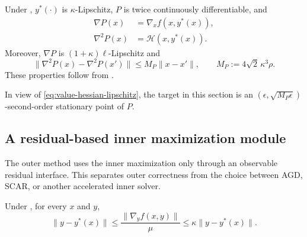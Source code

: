 \documentclass{article}
\begin{document}
\begin{lemma}\label{lem:value-geometry}
Under , $y^*(\cdot)$ is $\kappa$-Lipschitz, $P$ is twice
continuously differentiable, and
\begin{subequations}\label{eq:value-derivatives}
\begin{align}
 \nabla P(x)&=\nabla_xf(x,y^*(x)),\label{eq:value-gradient}\\
 \nabla^2P(x)&=\mathcal H(x,y^*(x)).\label{eq:value-hessian}
\end{align}
\end{subequations}
Moreover, $\nabla P$ is $(1+\kappa)\ell$-Lipschitz and
\begin{equation}\label{eq:value-hessian-lipschitz}
 \|\nabla^2P(x)-\nabla^2P(x')\|
 \le M_P\|x-x'\|,
 \qquad
 M_P:=4\sqrt2\,\kappa^3\rho.
\end{equation}
These properties follow from
\citet[Lemmas~1--3]{luo2022finding}.
\end{lemma}

In view of \eqref{eq:value-hessian-lipschitz}, the target in this
section is an
$(\epsilon,\sqrt{M_P\epsilon})$-second-order stationary point of $P$.

\subsection{A residual-based inner maximization module}

The outer method uses the inner maximization only through an observable
residual interface.  This separates outer correctness from the choice
between AGD, SCAR, or another accelerated inner solver.

\begin{lemma}
\label{lem:inner-residual-certificate}
Under , for every $x$ and $y$,
\begin{equation}\label{eq:inner-residual-certificate}
 \|y-y^*(x)\|
 \le\frac{\|\nabla_yf(x,y)\|}{\mu}
 \le\kappa\|y-y^*(x)\|.
\end{equation}
\end{lemma}
\end{document}
